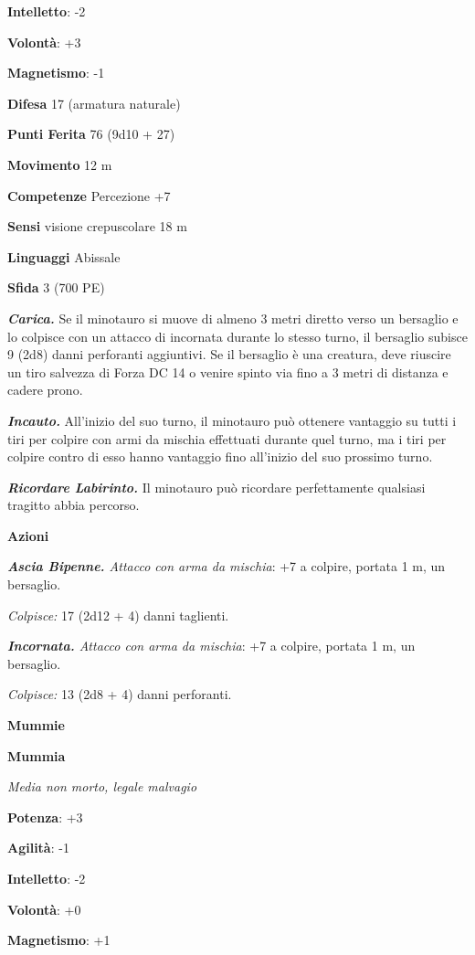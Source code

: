 \begin{multicols}{2}
\textbf{Intelletto}: -2

\textbf{Volontà}: +3

\textbf{Magnetismo}: -1

\textbf{Difesa} 17 (armatura naturale)

\textbf{Punti Ferita} 76 (9d10 + 27)

\textbf{Movimento} 12 m

\textbf{Competenze} Percezione +7

\textbf{Sensi} visione crepuscolare 18 m

\textbf{Linguaggi} Abissale

\textbf{Sfida} 3 (700 PE)\smallskip

\emph{\textbf{Carica.}} Se il minotauro si muove di almeno 3 metri
diretto verso un bersaglio e lo colpisce con un attacco di incornata
durante lo stesso turno, il bersaglio subisce 9 (2d8) danni perforanti
aggiuntivi. Se il bersaglio è una creatura, deve riuscire un tiro
salvezza di Forza DC 14 o venire spinto via fino a 3 metri di distanza e
cadere prono.

\emph{\textbf{Incauto.}} All'inizio del suo turno, il minotauro può
ottenere vantaggio su tutti i tiri per colpire con armi da mischia
effettuati durante quel turno, ma i tiri per colpire contro di esso
hanno vantaggio fino all'inizio del suo prossimo turno.

\emph{\textbf{Ricordare Labirinto.}} Il minotauro può ricordare
perfettamente qualsiasi tragitto abbia percorso.

\smallskip\textbf{Azioni}

\emph{\textbf{Ascia Bipenne.} Attacco con arma da mischia}: +7 a
colpire, portata 1 m, un bersaglio.

\emph{Colpisce:} 17 (2d12 + 4) danni taglienti.

\emph{\textbf{Incornata.} Attacco con arma da mischia}: +7 a colpire,
portata 1 m, un bersaglio.

\emph{Colpisce:} 13 (2d8 + 4) danni perforanti.

\textbf{Mummie}

\textbf{Mummia}

\emph{Media non morto, legale malvagio}

\textbf{Potenza}: +3

\textbf{Agilità}: -1

\textbf{Intelletto}: -2

\textbf{Volontà}: +0

\textbf{Magnetismo}: +1


\end{multicols}
